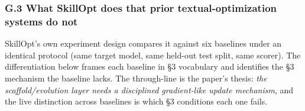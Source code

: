 \documentclass[
]{article}
\begin{document}
\subsubsection{G.3 What SkillOpt does that prior textual-optimization
systems do
not}\label{g.3-what-skillopt-does-that-prior-textual-optimization-systems-do-not}

SkillOpt's own experiment design compares it against six baselines under
an identical protocol (same target model, same held-out test split, same
scorer). The differentiation below frames each baseline in §3 vocabulary
and identifies the §3 mechanism the baseline lacks. The through-line is
the paper's thesis: \emph{the scaffold/evolution layer needs a
disciplined gradient-like update mechanism}, and the live distinction
across baselines is which §3 conditions each one fails.
\end{document}
